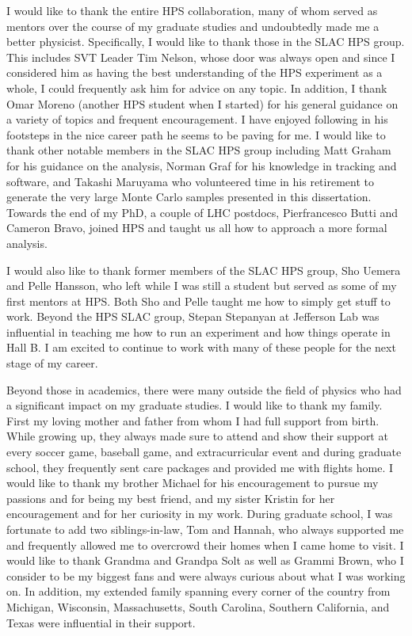 \documentclass{report}
\begin{document}
I would like to thank the entire HPS collaboration, many of whom served as mentors over the course of my graduate studies and undoubtedly made me a better physicist. Specifically, I would like to thank those in the SLAC HPS group. This includes SVT Leader Tim Nelson, whose door was always open and since I considered him as having the best understanding of the HPS experiment as a whole, I could frequently ask him for advice on any topic. In addition, I thank Omar Moreno (another HPS student when I started) for his general guidance on a variety of topics and frequent encouragement. I have enjoyed following in his footsteps in the nice career path he seems to be paving for me. I would like to thank other notable members in the SLAC HPS group including Matt Graham for his guidance on the analysis, Norman Graf for his knowledge in tracking and software, and Takashi Maruyama who volunteered time in his retirement to generate the very large Monte Carlo samples presented in this dissertation. Towards the end of my PhD, a couple of LHC postdocs, Pierfrancesco Butti and Cameron Bravo, joined HPS and taught us all how to approach a more formal analysis.

I would also like to thank former members of the SLAC HPS group, Sho Uemera and Pelle Hansson, who left while I was still a student but served as some of my first mentors at HPS. Both Sho and Pelle taught me how to simply get stuff to work. Beyond the HPS SLAC group, Stepan Stepanyan at Jefferson Lab was influential in teaching me how to run an experiment and how things operate in Hall B. I am excited to continue to work with many of these people for the next stage of my career.

Beyond those in academics, there were many outside the field of physics who had a significant impact on my graduate studies. I would like to thank my family. First my loving mother and father from whom I had full support from birth. While growing up, they always made sure to attend and show their support at every soccer game, baseball game, and extracurricular event and during graduate school, they frequently sent care packages and provided me with flights home. I would like to thank my brother Michael for his encouragement to pursue my passions and for being my best friend, and my sister Kristin for her encouragement and for her curiosity in my work. During graduate school, I was fortunate to add two siblings-in-law, Tom and Hannah, who always supported me and frequently allowed me to overcrowd their homes when I came home to visit. I would like to thank Grandma and Grandpa Solt as well as Grammi Brown, who I consider to be my biggest fans and were always curious about what I was working on. In addition, my extended family spanning every corner of the country from Michigan, Wisconsin, Massachusetts, South Carolina, Southern California, and Texas were influential in their support.
\end{document}
